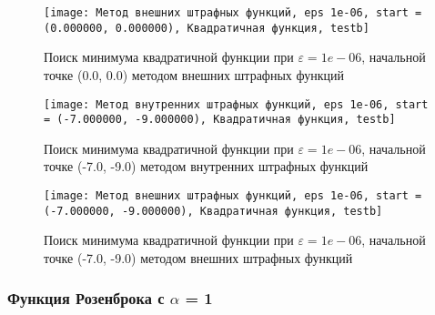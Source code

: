             \begin{figure}[H]
	        \centering
	        \texttt{[image: Метод внешних штрафных функций, eps 1e-06, start = (0.000000, 0.000000), Квадратичная функция, testb]}%
	        \caption{Поиск минимума квадратичной функции при $\varepsilon = 1e-06$, начальной точке (0.0, 0.0) методом внешних штрафных функций}
	        \vspace*{-1.2cm}
            \end{figure}
            
            \begin{figure}[H]
	        \centering
	        \texttt{[image: Метод внутренних штрафных функций, eps 1e-06, start = (-7.000000, -9.000000), Квадратичная функция, testb]}%
	        \caption{Поиск минимума квадратичной функции при $\varepsilon = 1e-06$, начальной точке (-7.0, -9.0) методом внутренних штрафных функций}
	        \vspace*{-1.2cm}
            \end{figure}
            
            \begin{figure}[H]
	        \centering
	        \texttt{[image: Метод внешних штрафных функций, eps 1e-06, start = (-7.000000, -9.000000), Квадратичная функция, testb]}%
	        \caption{Поиск минимума квадратичной функции при $\varepsilon = 1e-06$, начальной точке (-7.0, -9.0) методом внешних штрафных функций}
	        \vspace*{-1.2cm}
            \end{figure}
            \subsubsection{Функция Розенброка с $\alpha$ = 1}

